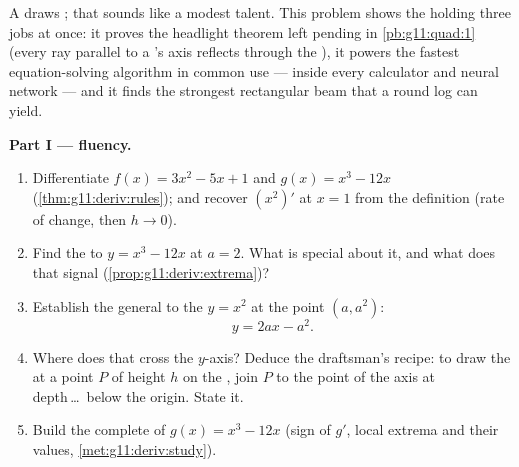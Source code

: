 \begin{problem}
\label{pb:g11:deriv:1}
A  draws ; that sounds like a modest talent.
This problem shows the  holding three jobs at once: it
proves the headlight theorem left pending in
\cref{pb:g11:quad:1} (every ray parallel to a 's axis
reflects through the ), it powers the fastest
equation-solving algorithm in common use --- inside every
calculator and neural network --- and it finds the strongest
rectangular beam that a round log can yield.

\medskip
\noindent\textbf{Part I ---  fluency.}
\begin{enumerate}
  \item Differentiate $f(x) = 3x^2 - 5x + 1$ and
        $g(x) = x^3 - 12x$
        (\cref{thm:g11:deriv:rules}); and recover $\left(x^2
        \right)'$ at $x = 1$ from the definition (rate of
        change, then $h \to 0$).
  \item Find the  to $y = x^3 - 12x$ at $a = 2$. What is
        special about it, and what does that signal
        (\cref{prop:g11:deriv:extrema})?
  \item Establish the general  to the  $y = x^2$
        at the point $(a, a^2)$:
        \[
        y = 2ax - a^2 .
        \]
  \item Where does that  cross the $y$-axis? Deduce the
        draftsman's recipe: to draw the  at a point $P$
        of height $h$ on the , join $P$ to the point of
        the axis at depth\,\dots\ below the origin. State it.
  \item Build the complete  of
        $g(x) = x^3 - 12x$ (sign of $g'$, local extrema and
        their values, \cref{met:g11:deriv:study}).
\end{enumerate}


\end{problem}
